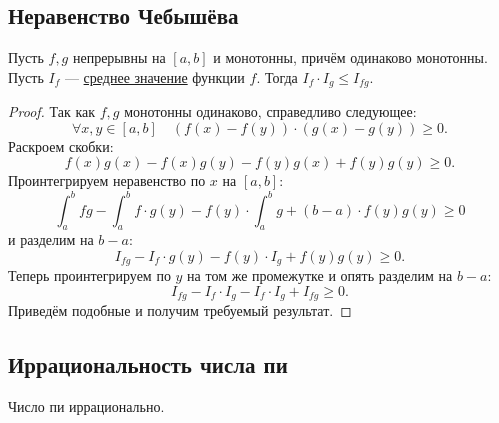 \subsection{Неравенство Чебышёва}

\begin{theorem}
	Пусть \(f, g\) непрерывны на \([a, b]\) и монотонны, причём одинаково монотонны. Пусть \(I_f\) --- \hyperlink{average}{среднее значение} функции \(f\). Тогда \(I_f \cdot I_g \leqslant I_{fg}\).
\end{theorem}

\begin{proof}
	Так как \(f, g\) монотонны одинаково, справедливо следующее: \[
		\forall x, y \in [a, b] \quad (f(x) - f(y)) \cdot (g(x) - g(y)) \geqslant 0.
	\]
	Раскроем скобки: \[
		f(x)g(x) - f(x)g(y) - f(y)g(x) + f(y)g(y) \geqslant 0.
	\]
	Проинтегрируем неравенство по \(x\) на \([a, b]\): \[
		\int_a^b fg - \int_a^b f \cdot g(y) - f(y) \cdot \int_a^b g + (b - a) \cdot f(y)g(y) \geqslant 0
	\]
	и разделим на \(b - a\): \[
		I_{fg} - I_f \cdot g(y) - f(y) \cdot I_g + f(y)g(y) \geqslant 0.
	\]
	Теперь проинтегрируем по \(y\) на том же промежутке и опять разделим на \(b - a\): \[
		I_{fg} - I_f \cdot I_g - I_f \cdot I_g + I_{fg} \geqslant 0.
	\]
	Приведём подобные и получим требуемый результат.
\end{proof}

\subsection{Иррациональность числа пи}


\begin{theorem}
	Число пи иррационально.
\end{theorem}

